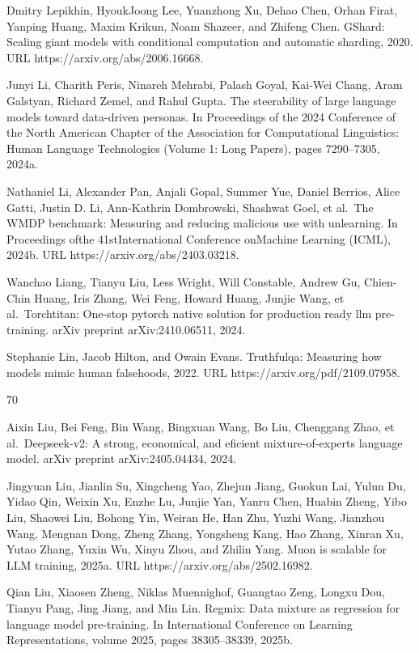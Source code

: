 \documentclass[
  10
]{article}
\begin{document}
Dmitry Lepikhin, HyoukJoong Lee, Yuanzhong Xu, Dehao Chen, Orhan Firat,
Yanping Huang, Maxim Krikun, Noam Shazeer, and Zhifeng Chen. GShard:
Scaling giant models with conditional computation and automatic
sharding, 2020. URL https://arxiv.org/abs/2006.16668.

Junyi Li, Charith Peris, Ninareh Mehrabi, Palash Goyal, Kai-Wei Chang,
Aram Galstyan, Richard Zemel, and Rahul Gupta. The steerability of large
language models toward data-driven personas. In Proceedings of the 2024
Conference of the North American Chapter of the Association for
Computational Linguistics: Human Language Technologies (Volume 1: Long
Papers), pages 7290--7305, 2024a.

Nathaniel Li, Alexander Pan, Anjali Gopal, Summer Yue, Daniel Berrios,
Alice Gatti, Justin D. Li, Ann-Kathrin Dombrowski, Shashwat Goel, et
al.~The WMDP benchmark: Measuring and reducing malicious use with
unlearning. In Proceedings ofthe 41stInternational Conference onMachine
Learning (ICML), 2024b. URL https://arxiv.org/abs/2403.03218.

Wanchao Liang, Tianyu Liu, Less Wright, Will Constable, Andrew Gu,
Chien-Chin Huang, Iris Zhang, Wei Feng, Howard Huang, Junjie Wang, et
al.~Torchtitan: One-stop pytorch native solution for production ready
llm pre-training. arXiv preprint arXiv:2410.06511, 2024.

Stephanie Lin, Jacob Hilton, and Owain Evans. Truthfulqa: Measuring how
models mimic human falsehoods, 2022. URL
https://arxiv.org/pdf/2109.07958.

70

Aixin Liu, Bei Feng, Bin Wang, Bingxuan Wang, Bo Liu, Chenggang Zhao, et
al.~Deepseek-v2: A strong, economical, and eficient mixture-of-experts
language model. arXiv preprint arXiv:2405.04434, 2024.

Jingyuan Liu, Jianlin Su, Xingcheng Yao, Zhejun Jiang, Guokun Lai, Yulun
Du, Yidao Qin, Weixin Xu, Enzhe Lu, Junjie Yan, Yanru Chen, Huabin
Zheng, Yibo Liu, Shaowei Liu, Bohong Yin, Weiran He, Han Zhu, Yuzhi
Wang, Jianzhou Wang, Mengnan Dong, Zheng Zhang, Yongsheng Kang, Hao
Zhang, Xinran Xu, Yutao Zhang, Yuxin Wu, Xinyu Zhou, and Zhilin Yang.
Muon is scalable for LLM training, 2025a. URL
https://arxiv.org/abs/2502.16982.

Qian Liu, Xiaosen Zheng, Niklas Muennighof, Guangtao Zeng, Longxu Dou,
Tianyu Pang, Jing Jiang, and Min Lin. Regmix: Data mixture as regression
for language model pre-training. In International Conference on Learning
Representations, volume 2025, pages 38305--38339, 2025b.
\end{document}
